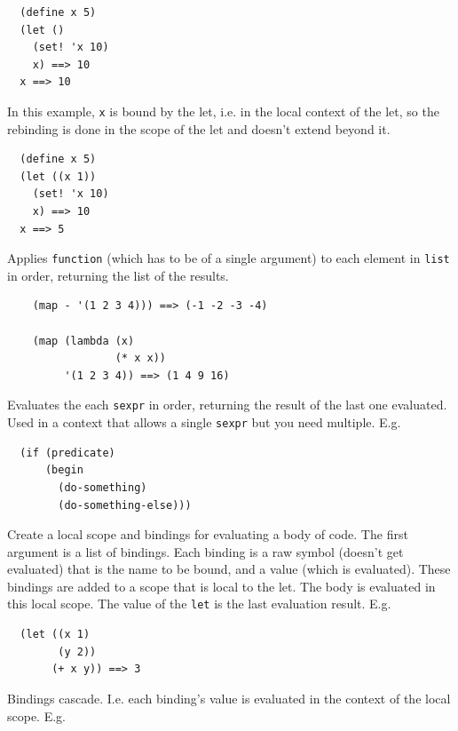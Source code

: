 \documentclass[12pt]{article}
\begin{document}
\begin{verbatim}
  (define x 5)
  (let ()
    (set! 'x 10)
    x) ==> 10
  x ==> 10
\end{verbatim}

In this example, \verb|x| is bound by the let, i.e. in the local
context of the let, so the rebinding is done in the scope of the let
and doesn't extend beyond it.

\begin{verbatim}
  (define x 5)
  (let ((x 1))
    (set! 'x 10)
    x) ==> 10
  x ==> 5
\end{verbatim}


Applies \verb|function| (which has to be of a single argument) to each
element in \verb|list| in order, returning the list of the results. 

\begin{verbatim}
    (map - '(1 2 3 4))) ==> (-1 -2 -3 -4)

    (map (lambda (x)
                 (* x x))
         '(1 2 3 4)) ==> (1 4 9 16)
\end{verbatim}


Evaluates the each \verb|sexpr| in order, returning the result of the
last one evaluated. Used in a context that allows a single
\verb|sexpr| but you need multiple. E.g.

\begin{verbatim}
  (if (predicate)
      (begin
        (do-something)
        (do-something-else)))
\end{verbatim}


Create a local scope and bindings for evaluating a body of code. The
first argument is a list of bindings. Each binding is a raw symbol
(doesn't get evaluated) that is the name to be bound, and a value
(which is evaluated). These bindings are added to a scope that is
local to the let. The body is evaluated in this local scope. The value
of the \verb|let| is the last evaluation result. E.g.

\begin{verbatim}
  (let ((x 1)
        (y 2))
       (+ x y)) ==> 3
\end{verbatim}

Bindings cascade. I.e. each binding's value is evaluated in the
context of the local scope. E.g.
\end{document}
